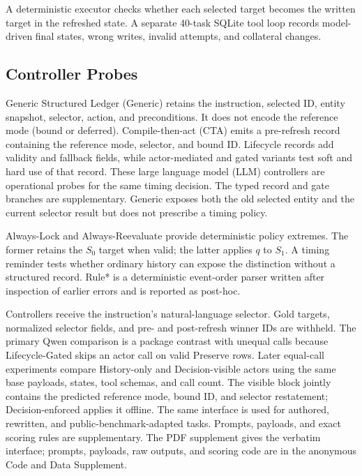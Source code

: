 \documentclass[letterpaper]{article}
\begin{document}
A deterministic executor checks whether each selected target becomes the written target in the
refreshed state. A separate 40-task SQLite tool loop records model-driven final states, wrong
writes, invalid attempts, and collateral changes.

\subsection{Controller Probes}
Generic Structured Ledger (Generic) retains the instruction, selected ID, entity snapshot,
selector, action, and preconditions. It does not encode the reference mode (bound or deferred).
Compile-then-act (CTA) emits a pre-refresh record containing the reference mode, selector, and bound
ID. Lifecycle records add validity and
fallback fields, while actor-mediated and gated variants test soft and hard use of that record.
These large language model (LLM) controllers are operational probes for the same timing decision.
The typed record and gate branches are supplementary. Generic exposes both the old selected entity
and the current selector result but does not prescribe a timing policy.

Always-Lock and Always-Reevaluate provide deterministic policy extremes. The former retains the
$S_0$ target when valid; the latter applies $q$ to $S_1$. A timing reminder tests whether ordinary
history can expose the distinction without a structured record. Rule* is a deterministic
event-order parser written after inspection of earlier errors and is reported as post-hoc.

Controllers receive the instruction's natural-language selector. Gold targets, normalized
selector fields, and pre- and post-refresh winner IDs are withheld. The primary Qwen comparison is
a package contrast with unequal calls because Lifecycle-Gated skips an actor call on valid Preserve
rows. Later equal-call experiments compare History-only and Decision-visible actors using the same
base payloads, states, tool schemas, and call count. The visible block jointly contains the predicted
reference mode, bound ID, and selector restatement; Decision-enforced applies it offline. The same interface
is used for authored, rewritten, and public-benchmark-adapted tasks. Prompts, payloads, and exact
scoring rules are supplementary. The PDF supplement gives the verbatim interface; prompts,
payloads, raw outputs, and scoring code are in the anonymous Code and Data Supplement.
\end{document}
